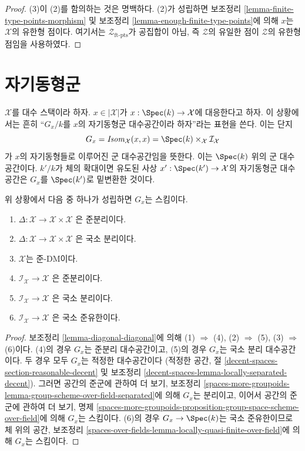 \begin{proof}
\medskip\noindent
(3)이 (2)를 함의하는 것은 명백하다.
(2)가 성립하면 보조정리 \ref{lemma-finite-type-points-morphism} 및
보조정리 \ref{lemma-enough-finite-type-points}에 의해 $x$는
$\mathcal{X}$의 유한형 점이다. 여기서는
$\mathcal{Z}_{\text{ft-pts}}$가 공집합이 아님, 즉 $\mathcal{Z}$의 유일한
점이 $\mathcal{Z}$의 유한형 점임을 사용하였다.
\end{proof}







\section{자기동형군}
\label{section-automorphism-groups}

\noindent
$\mathcal{X}$를 대수 스택이라 하자. $x \in |\mathcal{X}|$가
$x : \Spec(k) \to \mathcal{X}$에 대응한다고 하자. 이 상황에서는 흔히
``$G_x/k$를 $x$의 자기동형군 대수공간이라 하자''라는 표현을 쓴다.
이는 단지
$$
G_x = \mathit{Isom}_\mathcal{X}(x, x) =
\Spec(k) \times_\mathcal{X} \mathcal{I}_\mathcal{X}
$$
가 $x$의 자기동형들로 이루어진 군 대수공간임을 뜻한다. 이는
$\Spec(k)$ 위의 군 대수공간이다. $k'/k$가 체의 확대이면 유도된 사상
$x' : \Spec(k') \to \mathcal{X}$의 자기동형군 대수공간은 $G_x$를
$\Spec(k')$로 밑변환한 것이다.

\begin{lemma}
\label{lemma-automorphism-group-scheme}
위 상황에서 다음 중 하나가 성립하면 $G_x$는 스킴이다.
\begin{enumerate}
\item $\Delta : \mathcal{X} \to \mathcal{X} \times \mathcal{X}$
은 준분리이다.
\item $\Delta : \mathcal{X} \to \mathcal{X} \times \mathcal{X}$
은 국소 분리이다.
\item $\mathcal{X}$는 준-DM이다.
\item $\mathcal{I}_\mathcal{X} \to \mathcal{X}$
은 준분리이다.
\item $\mathcal{I}_\mathcal{X} \to \mathcal{X}$
은 국소 분리이다.
\item $\mathcal{I}_\mathcal{X} \to \mathcal{X}$
은 국소 준유한이다.
\end{enumerate}
\end{lemma}

\begin{proof}
보조정리 \ref{lemma-diagonal-diagonal}에 의해
(1) $\Rightarrow$ (4), (2) $\Rightarrow$ (5), (3) $\Rightarrow$ (6)이다.
(4)의 경우 $G_x$는 준분리 대수공간이고, (5)의 경우 $G_x$는 국소 분리
대수공간이다. 두 경우 모두 $G_x$는 적정한 대수공간이다
(적정한 공간, 절 \ref{decent-spaces-section-reasonable-decent} 및
보조정리 \ref{decent-spaces-lemma-locally-separated-decent}).
그러면 공간의 준군에 관하여 더 보기, 보조정리
\ref{spaces-more-groupoids-lemma-group-scheme-over-field-separated}에 의해
$G_x$는 분리이고, 이어서 공간의 준군에 관하여 더 보기, 명제
\ref{spaces-more-groupoids-proposition-group-space-scheme-over-field}에 의해
$G_x$는 스킴이다. (6)의 경우 $G_x \to \Spec(k)$는 국소 준유한이므로
체 위의 공간, 보조정리
\ref{spaces-over-fields-lemma-locally-quasi-finite-over-field}에 의해
$G_x$는 스킴이다.
\end{proof}

